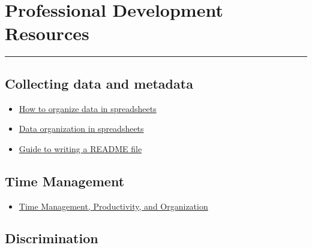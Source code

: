 \documentclass[
  letterpaper,
  DIV=11,
  numbers=noendperiod]{scrreprt}
\providecommand{\tightlist}{%
  \setlength{\itemsep}{0pt}\setlength{\parskip}{0pt}}\usepackage{longtable,booktabs,array}
\begin{document}
\hypertarget{professional-development-resources}{%
\chapter{Professional Development
Resources}\label{professional-development-resources}}

\begin{center}\rule{0.5\linewidth}{0.5pt}\end{center}

\hypertarget{collecting-data-and-metadata}{%
\section*{\texorpdfstring{\textbf{Collecting data and
metadata}}{Collecting data and metadata}}\label{collecting-data-and-metadata}}

\begin{itemize}
\item
  \href{https://datacarpentry.org/spreadsheet-ecology-lesson/02-common-mistakes/index.html}{How
  to organize data in spreadsheets}
\item
  \href{https://www.tandfonline.com/doi/full/10.1080/00031305.2017.1375989}{Data
  organization in spreadsheets}
\item
  \href{https://data.research.cornell.edu/content/readme}{Guide to
  writing a README file}
\end{itemize}

\hypertarget{time-management}{%
\section*{\texorpdfstring{\textbf{Time
Management}}{Time Management}}\label{time-management}}

\begin{itemize}
\tightlist
\item
  \href{https://docs.google.com/document/d/13xiuKlbF0ao1CSZoeDg5RmtGibtNRclVZeQpAYcLIFo/edit}{Time
  Management, Productivity, and Organization}
\end{itemize}

\hypertarget{discrimination}{%
\section*{\texorpdfstring{\textbf{Discrimination}}{Discrimination}}\label{discrimination}}
\end{document}
